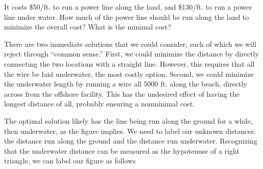 \documentclass{ximera}
\begin{document}
\begin{example}
\begin{image}
  \end{image}
  It costs \$50/ft. to run a power line along the land, and \$130/ft. to
  run a power line under water. How much of the power line should be run
  along the land to minimize the overall cost? What is the minimal cost?
  \begin{explanation}
    There are two immediate solutions that we could consider, each of
    which we will reject through ``common sense.'' First, we could
    minimize the distance by directly connecting the two locations with a
    straight line. However, this requires that all the wire be laid
    underwater, the most costly option. Second, we could minimize the
    underwater length by running a wire all 5000 ft. along the beach,
    directly across from the offshore facility. This has the undesired
    effect of having the longest distance of all, probably ensuring a
    nonminimal cost.
    
    The optimal solution likely has the line being run along the
    ground for a while, then underwater, as the figure implies. We
    need to label our unknown distances: the distance run along the
    ground and the distance run underwater. Recognizing that the
    underwater distance can be measured as the hypotenuse of a right
    triangle, we can label our figure as follows
      \begin{image}
\end{image}
\end{explanation}
\end{example}
\end{document}
